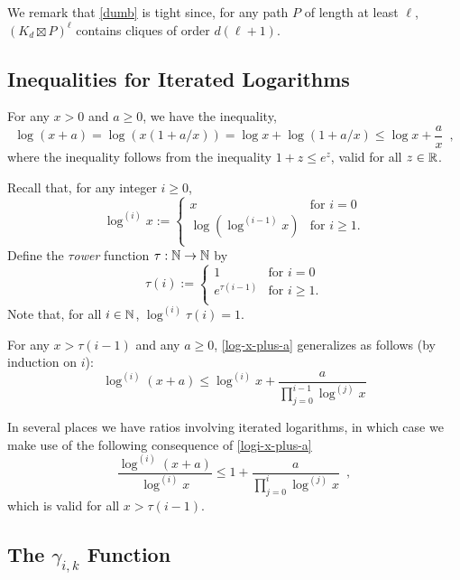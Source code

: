 \documentclass[kpfonts]{patmorin}
\newcommand{\defin}[1]{\emph{\color{brightmaroon}#1}}
\theoremstyle{named}
\begin{document}
We remark that \cref{dumb} is tight since, for any path $P$ of length at least $\ell$, $(K_d\boxtimes P)^\ell$ contains cliques of order $d(\ell+1)$.

\subsection{Inequalities for Iterated Logarithms}

For any $x> 0$ and $a\ge 0$, we have the inequality,
\begin{equation}
    \log (x+a) = \log (x(1+a/x)) = \log x + \log(1+a/x)
    \le \log x + \frac{a}{x} \enspace , \label{log-x-plus-a}
\end{equation}
where the inequality follows from the inequality $1+z\le e^z$, valid for all $z\in\mathbb{R}$.

Recall that, for any integer $i\ge 0$,
\[
    \log^{(i)} x :=
      \begin{cases}
          x & \text{for $i=0$} \\
          \log\left(\log^{(i-1)}x\right) & \text{for $i\ge 1$.} \\
      \end{cases}
\]
Define the \defin{$\tau$ower} function $\tau:\mathbb{N}\to\mathbb{N}$ by
\[
  \tau(i) :=
    \begin{cases}
        1 & \text{for $i=0$} \\
        e^{\tau(i-1)} & \text{for $i\ge 1$.} \\
    \end{cases}
\]
Note that, for all $i\in\mathbb{N}$, $\log^{(i)}\tau(i)=1$.

For any $x > \tau(i-1)$ and any $a\ge 0$, \cref{log-x-plus-a} generalizes as follows (by induction on $i$):
\begin{equation}
    \log^{(i)}(x+a) \le \log^{(i)} x + \frac{a}{\prod_{j=0}^{i-1}\log^{(j)} x} \label{logi-x-plus-a}
\end{equation}

In several places we have ratios involving iterated logarithms, in which case we make use of the following consequence of \cref{logi-x-plus-a}
\begin{equation}
    \frac{\log^{(i)} (x+a)}{\log^{(i)} x} \le 1 + \frac{a}{\prod_{j=0}^{i}\log^{(j)} x} \enspace, \label{logi-ratio}
\end{equation}
which is valid for all $x> \tau(i-1)$.

\subsection{The $\gamma_{i,k}$ Function}
\end{document}
